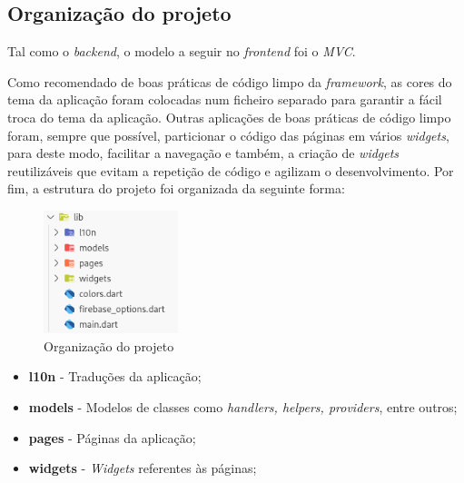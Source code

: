 \subsection{Organização do projeto}
Tal como o \textit{backend}, o modelo a seguir no \textit{frontend} foi o \textit{MVC}. 

Como recomendado de boas práticas de código limpo da \textit{framework}, as cores do tema da aplicação foram colocadas num ficheiro separado para garantir a fácil troca do tema da aplicação. Outras aplicações de boas práticas de código limpo foram, sempre que possível, particionar o código das páginas em vários \textit{widgets}, para deste modo, facilitar a navegação e também, a criação de \textit{widgets} reutilizáveis que evitam a repetição de código e agilizam o desenvolvimento. Por fim, a estrutura do projeto foi organizada da seguinte forma:
\begin{figure}[htb]
  \centering
  \includegraphics[width=0.35\textwidth]{images/implementacao/frontend/organizacao_projeto.png}
  \caption{Organização do projeto}
  \label{fig:69}
\end{figure}

\begin{itemize}
  \item \textbf{l10n} - Traduções da aplicação;
  \item \textbf{models} - Modelos de classes como \textit{handlers, helpers, providers}, entre outros;
  \item \textbf{pages} - Páginas da aplicação;
  \item \textbf{widgets} - \textit{Widgets} referentes às páginas;
\end{itemize}
\vspace{50mm}

